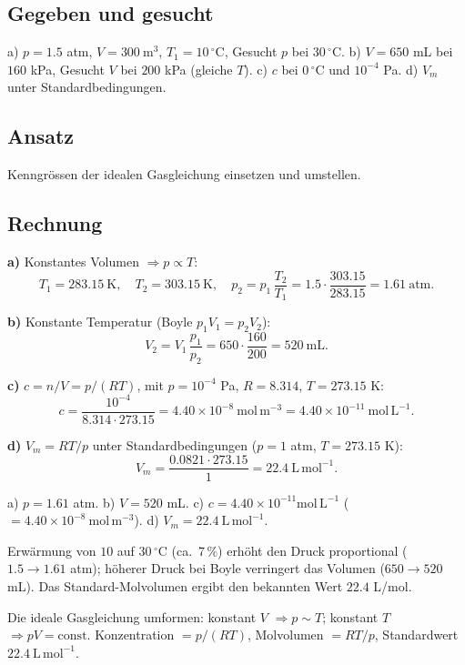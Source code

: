 
\subsection*{Gegeben und gesucht}
a) $p=1.5$ atm, $V=300\ \mathrm{m^3}$, $T_1=10\,^\circ\mathrm{C}$,
Gesucht $p$ bei $30\,^\circ\mathrm{C}$. b) $V=650$ mL bei $160$ kPa,
Gesucht $V$ bei $200$ kPa (gleiche $T$). c) $c$ bei $0\,^\circ\mathrm{C}$
und $10^{-4}$ Pa. d) $V_m$ unter Standardbedingungen.

\subsection*{Ansatz}
Kenngr\"ossen der idealen Gasgleichung einsetzen und umstellen.

\subsection*{Rechnung}
\textbf{a)} Konstantes Volumen $\Rightarrow p\propto T$:
\[
  T_1=283.15\ \mathrm{K},\quad T_2=303.15\ \mathrm{K},
  \quad p_2 = p_1\,\frac{T_2}{T_1}
  = 1.5\cdot\frac{303.15}{283.15} = 1.61\ \mathrm{atm}.
\]

\textbf{b)} Konstante Temperatur (Boyle $p_1V_1=p_2V_2$):
\[
  V_2 = V_1\,\frac{p_1}{p_2} = 650\cdot\frac{160}{200}
  = 520\ \mathrm{mL}.
\]

\textbf{c)} $c = n/V = p/(RT)$, mit $p=10^{-4}$ Pa, $R=8.314$,
$T=273.15$ K:
\[
  c=\frac{10^{-4}}{8.314\cdot 273.15}
   = 4.40\times10^{-8}\ \mathrm{mol\,m^{-3}}
   = 4.40\times10^{-11}\ \mathrm{mol\,L^{-1}} .
\]

\textbf{d)} $V_m = RT/p$ unter Standardbedingungen ($p=1$ atm,
$T=273.15$ K):
\[
  V_m = \frac{0.0821\cdot 273.15}{1} = 22.4\ \mathrm{L\,mol^{-1}} .
\]

\begin{ergebnis}
a) $p=1.61$ atm. b) $V=520$ mL. c) $c=4.40\times10^{-11}\mathrm{mol\,L^{-1}}$
($=4.40\times10^{-8}\ \mathrm{mol\,m^{-3}}$). d) $V_m=22.4\ \mathrm{L\,mol^{-1}}$.
\end{ergebnis}

\begin{kontrolle}
Erw\"armung von $10$ auf $30\,^\circ\mathrm{C}$ (ca.\ 7\,\%) erh\"oht den
Druck proportional ($1.5 \to 1.61$ atm); h\"oherer Druck bei Boyle
verringert das Volumen ($650 \to 520$ mL). Das Standard-Molvolumen ergibt
den bekannten Wert $22.4$ L/mol.
\end{kontrolle}

\begin{merksatz}
Die ideale Gasgleichung umformen: konstant $V$ $\Rightarrow p\sim T$;
konstant $T$ $\Rightarrow pV=\text{const}$. Konzentration $=p/(RT)$,
Molvolumen $=RT/p$, Standardwert $22.4\ \mathrm{L\,mol^{-1}}$.
\end{merksatz}
